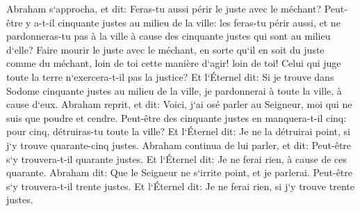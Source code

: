\verse Abraham s`approcha, et dit: Feras-tu aussi périr le juste avec le méchant? 
\verse Peut-être y a-t-il cinquante justes au milieu de la ville: les feras-tu périr aussi, et ne pardonneras-tu pas à la ville à cause des cinquante justes qui sont au milieu d`elle? 
\verse Faire mourir le juste avec le méchant, en sorte qu`il en soit du juste comme du méchant, loin de toi cette manière d`agir! loin de toi! Celui qui juge toute la terre n`exercera-t-il pas la justice? 
\verse Et l`Éternel dit: Si je trouve dans Sodome cinquante justes au milieu de la ville, je pardonnerai à toute la ville, à cause d`eux. 
\verse Abraham reprit, et dit: Voici, j`ai osé parler au Seigneur, moi qui ne suis que poudre et cendre. 
\verse Peut-être des cinquante justes en manquera-t-il cinq: pour cinq, détruiras-tu toute la ville? Et l`Éternel dit: Je ne la détruirai point, si j`y trouve quarante-cinq justes. 
\verse Abraham continua de lui parler, et dit: Peut-être s`y trouvera-t-il quarante justes. Et l`Éternel dit: Je ne ferai rien, à cause de ces quarante. 
\verse Abraham dit: Que le Seigneur ne s`irrite point, et je parlerai. Peut-être s`y trouvera-t-il trente justes. Et l`Éternel dit: Je ne ferai rien, si j`y trouve trente justes. 
